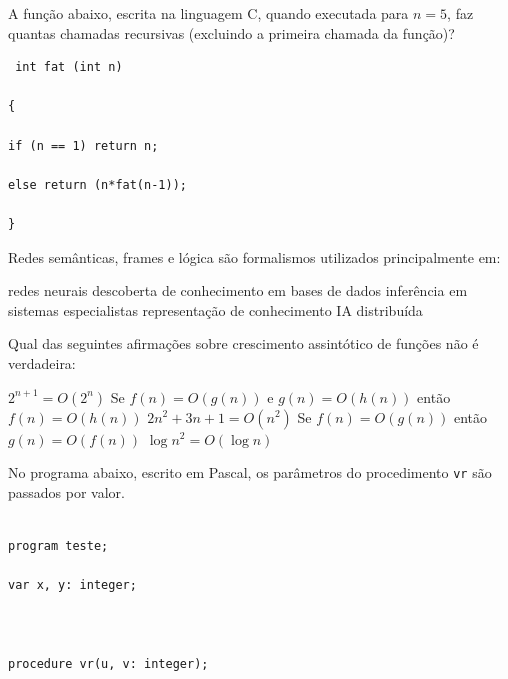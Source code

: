 \documentclass[12pt, addpoints]{exam}
\begin{document}
    \begin{questions}

    \newpage
    \question

A função abaixo, escrita na linguagem C, quando executada para \( n = 5 \), faz quantas chamadas recursivas (excluindo a primeira chamada da função)? 

\begin{verbatim} int fat (int n) 

{ 

if (n == 1) return n; 

else return (n*fat(n-1)); 

} 

\end{verbatim}
\begin{choices}
\end{choices}

\question

Redes semânticas, frames e lógica são formalismos utilizados principalmente em: 
\begin{choices}
\choice redes neurais
\choice descoberta de conhecimento em bases de dados
\choice inferência em sistemas especialistas
\choice representação de conhecimento
\choice IA distribuída
\end{choices}

\question

Qual das seguintes afirmações sobre crescimento assintótico de funções não é verdadeira:
\begin{choices}
\choice \( 2^{n+1} = O(2^n) \)
\choice Se \( f(n) = O(g(n)) \) e \( g(n) = O(h(n)) \) então \( f(n) = O(h(n)) \)
\choice \( 2n^2 + 3n + 1 = O(n^2) \)
\choice Se \( f(n) = O(g(n)) \) então \( g(n) = O(f(n)) \)
\choice \( \log n^2 = O(\log n) \)
\end{choices}

\question

No programa abaixo, escrito em Pascal, os parâmetros do procedimento \texttt{vr} são passados por valor.



\begin{verbatim}

program teste;

var x, y: integer;



procedure vr(u, v: integer);


\end{verbatim}
\end{questions}
\end{document}

